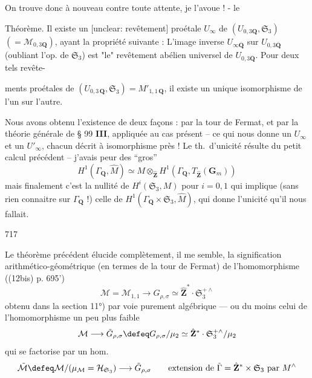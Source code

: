 On trouve donc à nouveau
contre toute attente, je l'avoue ! -
le

Théorème. Il existe un [unclear: revêtement]
proétale $U_{\infty}$ de $(U_{0,3 \mathbf{Q}}, \mathfrak{S}_3)$ $(= \mathcal{M}_{0,3 \mathbf{Q}})$, ayant
la propriété suivante : L'image inverse
$U_{\infty \overline{\mathbf{Q}}}$ sur $U_{0,3 \overline{\mathbf{Q}}}$ (oubliant l'op. de $\mathfrak{S}_3$)
est "le" revêtement abélien universel
de $U_{0,3 \overline{\mathbf{Q}}}$. Pour deux tels revête-

\newpage


ments proétales de $(U_{0,3\,\mathbf{Q}}, \mathfrak{S}_3) = M'_{1,1\,\mathbf{Q}}$,
il existe un unique isomorphisme
de l'un sur l'autre.

Nous avons obtenu l'existence de
deux façons : par la tour de Fermat,
et par la théorie générale de § 99 \textbf{III},
appliquée au cas présent -- ce qui
nous donne un $U_\infty$ et un $U'_\infty$,
chacun décrit à isomorphisme près !
Le th.\ d'unicité résulte du
petit calcul précédent -- j'avais
peur des ``gros''
$$
H^1(\Gamma_{\mathbf{Q}}, \hat{M}) \simeq M \otimes_{\hat{\mathbf{Z}}} H^1(\Gamma_{\mathbf{Q}}, T_{\hat{\mathbf{Z}}}(\mathbf{G}_m))
$$
mais finalement c'est la nullité de
$H^i(\mathfrak{S}_3, M)$ pour $i=0, 1$ qui implique
(sans rien connaitre sur $\Gamma_{\mathbf{Q}}$ !)
celle de $H^1(\Gamma_{\mathbf{Q}} \times \mathfrak{S}_3, \hat{M})$, qui donne
l'unicité qu'il nous fallait.

\newpage


717

Le théorème précédent élucide complètement, il me semble, la signification arithmético-géométrique (en termes de la tour de Fermat) de l'homomorphisme ((12bis) p. 695')
$$
\mathcal{M} = \mathcal{M}_{1,1} \longrightarrow G_{\rho,\sigma} \simeq \hat{\mathbf{Z}}^* \cdot \mathfrak{S}_3^{+ \wedge}
$$
obtenu dans la section 11°) par voie purement algébrique — ou du moins celui de l'homomorphisme un peu plus faible
$$
\mathcal{M} \longrightarrow \tilde{G}_{\rho,\sigma} \defeq G_{\rho,\sigma} / \mu_2 \simeq \hat{\mathbf{Z}}^* \cdot \mathfrak{S}_3^{+ \wedge} / \mu_2
$$
qui se factorise par un hom.
$$
\tilde{\mathcal{M}} \defeq \mathcal{M}/(\mu_{\mathcal{M}} = \mathcal{H}_{\mathfrak{S}_3}) \longrightarrow \tilde{G}_{\rho,\sigma} \qquad \text{extension de } \tilde{\Gamma} = \hat{\mathbf{Z}}^* \times \mathfrak{S}_3 \text{ par } M^\wedge
$$

